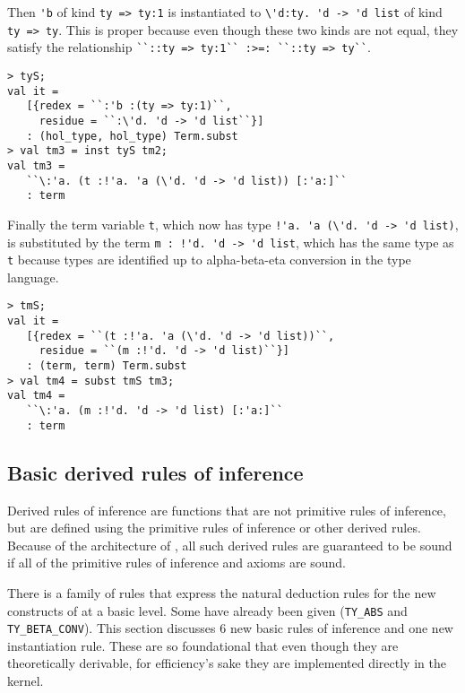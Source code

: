 Then {\small\verb|'b|} of kind {\small\verb|ty => ty:1|}
is instantiated to {\small\verb|\'d:ty. 'd -> 'd list|} of kind
{\small\verb|ty => ty|}.
This is proper because even though these two kinds are not equal,
they satisfy the relationship
{\small\verb|``::ty => ty:1`` :>=: ``::ty => ty``|}.
%
\begin{session}
\begin{verbatim}
> tyS;
val it =
   [{redex = ``:'b :(ty => ty:1)``,
     residue = ``:\'d. 'd -> 'd list``}]
   : (hol_type, hol_type) Term.subst
> val tm3 = inst tyS tm2;
val tm3 =
   ``\:'a. (t :!'a. 'a (\'d. 'd -> 'd list)) [:'a:]``
   : term
\end{verbatim}
\end{session}


Finally the term variable {\small\verb|t|}, which now has type
{\small\verb|!'a. 'a (\'d. 'd -> 'd list)|}, is substituted by the
term {\small\verb|m : !'d. 'd -> 'd list|}, which has the same type as
{\small\verb|t|} because types are identified up to alpha-beta-eta conversion
in the type language.
%
\begin{session}
\begin{verbatim}
> tmS;
val it =
   [{redex = ``(t :!'a. 'a (\'d. 'd -> 'd list))``,
     residue = ``(m :!'d. 'd -> 'd list)``}]
   : (term, term) Term.subst
> val tm4 = subst tmS tm3;
val tm4 =
   ``\:'a. (m :!'d. 'd -> 'd list) [:'a:]``
   : term
\end{verbatim}
\end{session}


\subsection{Basic derived rules of inference}

Derived rules of inference are \ML{} functions that are not primitive
rules of inference, but are defined using the primitive rules of inference
or other derived rules.  Because of the \LCF{} architecture of \HOLW,
all such derived rules are guaranteed to be sound
if all of the primitive rules of inference and axioms are sound.

There is a family of rules that express the natural deduction rules
for the new constructs of \HOLW{} at a basic level.  Some have already been
given (\texttt{TY\_ABS} and \texttt{TY\_BETA\_CONV}).
This section discusses 6 new basic rules of inference
and one new instantiation rule.  These are so foundational that even though
they are theoretically derivable, for efficiency's sake they are implemented
directly in the \HOLW{} kernel.

